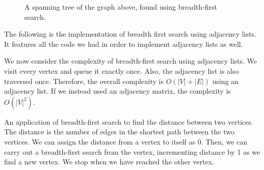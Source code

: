 \documentclass[a4paper, openany]{memoir}
\begin{document}
\begin{figure}[H]
    \centering
    \caption{A spanning tree of the graph above, found using breadth-first search.}
\end{figure}
The following is the implementation of breadth first search using adjacency lists. It features all the code we had in order to implement adjacency lists as well.


We now consider the complexity of breadth-first search using adjacency lists. We visit every vertex and queue it exactly once. Also, the adjacency list is also traversed once. Therefore, the overall complexity is $O(|V| + |E|)$ using an adjacency list. If we instead used an adjacency matrix, the complexity is $O(|V|^2)$.

An application of breadth-first search to find the distance between two vertices. The distance is the number of edges in the shortest path between the two vertices. We can assign the distance from a vertex to itself as 0. Then, we can carry out a breadth-first search from the vertex, incrementing distance by 1 as we find a new vertex. We stop when we have reached the other vertex. 
\end{document}
